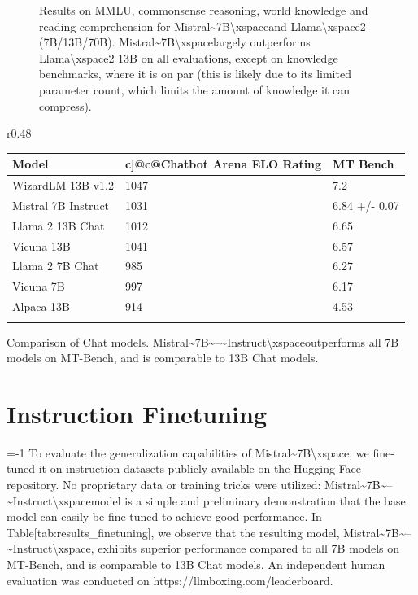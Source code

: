 \documentclass[11pt,a4paper]{article}
\begin{document}
\begin{figure}[h]
\caption{Results on MMLU, commonsense reasoning, world knowledge and reading comprehension for Mistral\textasciitilde{}7B\textbackslash{}xspaceand Llama\textbackslash{}xspace2 (7B/13B/70B). Mistral\textasciitilde{}7B\textbackslash{}xspacelargely outperforms Llama\textbackslash{}xspace2 13B on all evaluations, except on knowledge benchmarks, where it is on par (this is likely due to its limited parameter count, which limits the amount of knowledge it can compress).}
\end{figure}

r0.48

\begin{table}[h]
\begin{tabular}{|l|l|l|}
\hline
Model & c]@c@Chatbot Arena ELO Rating & MT Bench \\ \hline
WizardLM 13B v1.2 & 1047 & 7.2 \\ \hline
Mistral 7B Instruct & 1031 & 6.84 +/- 0.07 \\ \hline
Llama 2 13B Chat & 1012 & 6.65 \\ \hline
Vicuna 13B & 1041 & 6.57 \\ \hline
Llama 2 7B Chat & 985 & 6.27 \\ \hline
Vicuna 7B & 997 & 6.17 \\ \hline
Alpaca 13B & 914 & 4.53 \\ \hline
 &  &  \\ \hline
\end{tabular}
\end{table}

Comparison of Chat models. Mistral\textasciitilde{}7B\textasciitilde{}--\textasciitilde{}Instruct\textbackslash{}xspaceoutperforms all 7B models on MT-Bench, and is comparable to 13B  Chat models.

\section{Instruction Finetuning}

=-1 To evaluate the generalization capabilities of Mistral\textasciitilde{}7B\textbackslash{}xspace, we fine-tuned it on instruction datasets publicly available on the Hugging Face repository. No proprietary data or training tricks were utilized: Mistral\textasciitilde{}7B\textasciitilde{}--\textasciitilde{}Instruct\textbackslash{}xspacemodel is a simple and preliminary demonstration that the base model can easily be fine-tuned to achieve good performance. In Table[tab:results\_finetuning], we observe that the resulting model, Mistral\textasciitilde{}7B\textasciitilde{}--\textasciitilde{}Instruct\textbackslash{}xspace, exhibits superior performance compared to all 7B models on MT-Bench, and is comparable to 13B  Chat models. An independent human evaluation was conducted on https://llmboxing.com/leaderboard.
\end{document}

